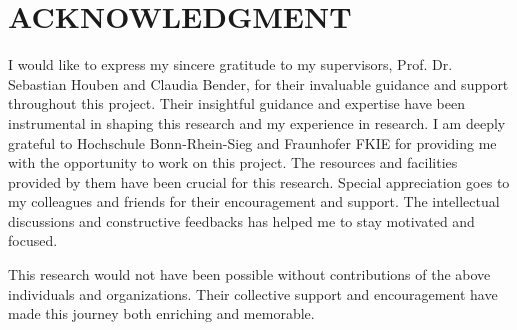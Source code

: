 \documentclass[../report.tex]{subfiles}
\begin{document}
    \section*{ACKNOWLEDGMENT}

    I would like to express my sincere gratitude to my supervisors, Prof. Dr. Sebastian Houben and Claudia Bender, for their invaluable guidance
    and support throughout this project. Their insightful guidance and expertise have been instrumental in shaping this research and my experience in research. 
    I am deeply grateful to Hochschule Bonn-Rhein-Sieg and Fraunhofer FKIE for providing me with the opportunity to work on this project. The resources and facilities
    provided by them have been crucial for this research. Special appreciation goes to my colleagues and friends for their encouragement and support. The intellectual
    discussions and constructive feedbacks has helped me to stay motivated and focused. 
    
    
    This research would not have been possible without contributions of the above individuals and organizations. Their collective support and encouragement have made
    this journey both enriching and memorable.
\end{document}
